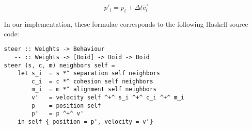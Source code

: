\[ p\prime_i = p_i + \Delta t\vec{v_i}\]

In our implementation, these formulae corresponds to the following Haskell source code:

\begin{verbatim}
steer :: Weights -> Behaviour
   -- :: Weights -> [Boid] -> Boid -> Boid
steer (s, c, m) neighbors self =
    let s_i  = s *^ separation self neighbors
        c_i  = c *^ cohesion self neighbors
        m_i  = m *^ alignment self neighbors
        v'   = velocity self ^+^ s_i ^+^ c_i ^+^ m_i
        p    = position self
        p'   = p ^+^ v'
    in self { position = p', velocity = v'}
\end{verbatim}

\vfill
\pagebreak

 
 


